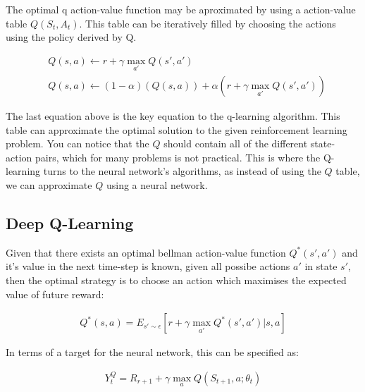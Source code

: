 The optimal q action-value function may be aproximated by using a action-value table $Q(S_{t}, A_{t})$.
This table can be iteratively filled by choosing the actions using the policy derived by Q.

\begin{align}
& Q(s,a) \leftarrow r + \gamma \max_{a'} Q(s',a') \\
& Q(s,a) \leftarrow (1-\alpha)(Q(s,a)) + \alpha(r + \gamma \max_{a'} Q(s',a'))
\label{eq:Qlearning}
\end{align}

The last equation above is the key equation to the q-learning algorithm.
This table can approximate the optimal solution to the given reinforcement learning problem.
You can notice that the $Q$ should contain all of the different state-action pairs, which for many problems is not practical.
This is where the Q-learning turns to the neural network's algorithms, as instead of using the $Q$ table, we can approximate $Q$ using a neural network.


\subsection{Deep Q-Learning}
\label{sec:dqn}

Given that there exists an optimal bellman action-value function $Q^{*}(s',a')$ \cite{https://doi.org/10.48550/arxiv.1312.5602} and it's value in the next time-step is known, given all possibe actions  $a'$ in state $s'$, then the optimal strategy is to choose an action which maximises the expected value of future reward:

\begin{align}
  Q^{*}(s,a) = E_{s' \sim \epsilon} \left[ r + \gamma \max_{a'} Q^{*}(s',a') \bigg| s,a \right]
\label{eq:deepQlearning}
\end{align}

In terms of a target for the neural network, this can be specified as:

\begin{align}
 Y_{t}^{Q} =  R_{r+1} + \gamma \max_{a} Q(S_{t+1},a; \theta_{t})
\label{eq:deepQlearningTarget}
\end{align}

